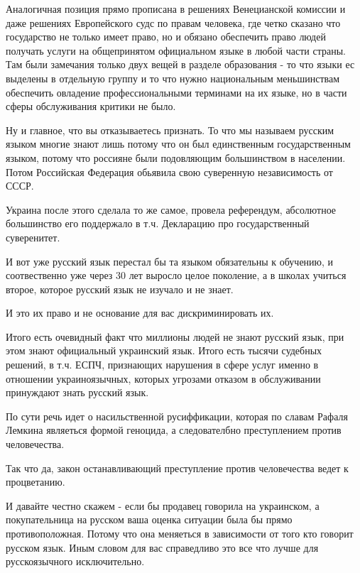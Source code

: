 \begin{itemize}
\begin{itemize}
Аналогичная позиция прямо прописана в решениях Венецианской комиссии и даже
решениях Европейского судс по правам человека, где четко сказано что
государство не только имеет право, но и обязано обеспечить право людей получать
услуги на общепринятом официальном языке в любой части страны. Там были
замечания только двух вещей в разделе образования - то что языки ес выделены в
отдельную группу и то что нужно национальным меньшинствам обеспечить овладение
профессиональными терминами на их языке, но в части сферы обслуживания критики
не было.

Ну и главное, что вы отказываетесь признать. То что мы называем русским языком
многие знают лишь потому что он был единственным государственным языком, потому
что россияне были подовляющим большинством в населении. Потом Российская
Федерация обьявила свою суверенную независимость от СССР.

Украина после этого сделала то же самое, провела референдум, абсолютное
большинство его поддержало в т.ч. Декларацию про государственный суверенитет.

И вот уже русский язык перестал бы та языком обязательны к обучению, и
соотвественно уже через 30 лет выросло целое поколение, а в школах учиться
второе, которое русский язык не изучало и не знает.

И это их право и не основание для вас дискриминировать их.

Итого есть очевидный факт что миллионы людей не знают русский язык, при этом
знают официальный украинский язык. Итого есть тысячи судебных решений, в т.ч.
ЕСПЧ, признающих нарушения в сфере услуг именно в отношении украиноязычных,
которых угрозами отказом в обслуживании принуждают знать русский язык.

По сути речь идет о насильственной русиффикации, которая по славам Рафаля
Лемкина являеться формой геноцида, а следователбно преступлением против
человечества.

Так что да, закон останавливающий преступление против человечества ведет к
процветанию.

 

И давайте честно скажем - если бы продавец говорила на украинском, а
покупательница на русском ваша оценка ситуации была бы прямо противоположная.
Потому что она меняеться в зависимости от того кто говорит русском язык. Иным
словом для вас справедливо это все что лучше для русскоязычного исключительно.


\end{itemize}
\end{itemize}

